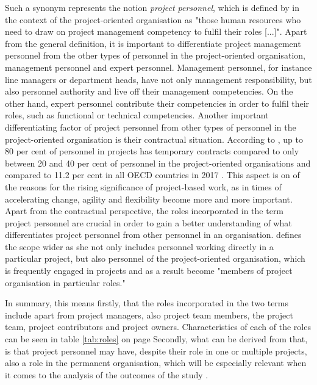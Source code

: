 Such a synonym represents the notion \textit{project personnel}, which is defined by  in the context of the project-oriented organisation as "those human resources who need to draw on project management competency to fulfil their roles [...]". Apart from the general definition, it is important to differentiate project management personnel from the other types of personnel in the project-oriented organisation, management personnel and expert personnel. Management personnel, for instance line managers or department heads, have not only management responsibility, but also personnel authority and live off their management competencies. On the other hand, expert personnel contribute their competencies in order to fulfil their roles, such as functional or technical competencies. Another important differentiating factor of project personnel from other types of personnel in the project-oriented organisation is their contractual situation. According to , up to 80 per cent of personnel in projects has temporary contracts compared  to only between 20 and 40 per cent of personnel in the project-oriented organisations and compared to 11.2 per cent in all OECD countries in 2017 \cite{OECD17}. This aspect is on of the reasons for the rising significance of project-based work, as in times of accelerating change, agility and flexibility become more and more important. Apart from the contractual perspective, the roles incorporated in the term project personnel are crucial in order to gain a better understanding of what differentiates project personnel from other personnel in an organisation.  defines the scope wider as she not only includes personnel working directly in a particular project, but also personnel of the project-oriented organisation, which is frequently engaged in projects and as a result become "members of project organisation in particular roles."

In summary, this means firstly, that the roles incorporated in the two terms include apart from project managers, also project team members, the project team, project contributors and project owners. Characteristics of each of the roles can be seen in table \ref{tab:roles} on page \pageref{tab:roles} Secondly, what can be derived from that, is that project personnel may have, despite their role in one or multiple projects, also a role in the permanent organisation, which will be especially relevant when it comes to the analysis of the outcomes of the study \cite{huemann15}.

